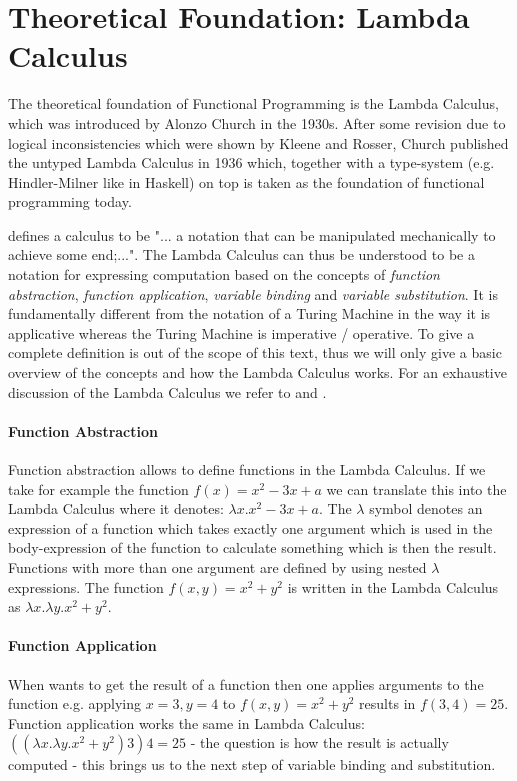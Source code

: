 \section{Theoretical Foundation: Lambda Calculus}
The theoretical foundation of Functional Programming is the Lambda Calculus, which was introduced by Alonzo Church in the 1930s. After some revision due to logical inconsistencies which were shown by Kleene and Rosser, Church published the untyped Lambda Calculus in 1936 which, together with a type-system (e.g. Hindler-Milner like in Haskell) on top is taken as the foundation of functional programming today.

\cite{maclennan_functional_1990} defines a calculus to be "... a notation that can be manipulated mechanically to achieve some end;...". The Lambda Calculus can thus be understood to be a notation for expressing computation based on the concepts of \textit{function abstraction}, \textit{function application}, \textit{variable binding} and \textit{variable substitution}. It is fundamentally different from the notation of a Turing Machine in the way it is applicative whereas the Turing Machine is imperative / operative. To give a complete definition is out of the scope of this text, thus we will only give a basic overview of the concepts and how the Lambda Calculus works. For an exhaustive discussion of the Lambda Calculus we refer to \cite{maclennan_functional_1990} and \cite{barendregt_lambda_1984}.

\paragraph{Function Abstraction}
Function abstraction allows to define functions in the Lambda Calculus. If we take for example the function $f(x) = x^2 - 3x + a$ we can translate this into the Lambda Calculus where it denotes: $\lambda x.x^2 - 3x + a$. The $\lambda$ symbol denotes an expression of a function which takes exactly one argument which is used in the body-expression of the function to calculate something which is then the result. Functions with more than one argument are defined by using nested $\lambda$ expressions. The function $f(x, y) = x^2 + y^2$ is written in the Lambda Calculus as $\lambda x.\lambda y.x^2 + y^2$.

\paragraph{Function Application}
When wants to get the result of a function then one applies arguments to the function e.g. applying $x = 3, y = 4$ to $f(x, y) = x^2 + y^2$ results in $f(3, 4) = 25$. Function application works the same in Lambda Calculus: $((\lambda x.\lambda y.x^2 + y^2) 3) 4 = 25$ - the question is how the result is actually computed - this brings us to the next step of variable binding and substitution.

